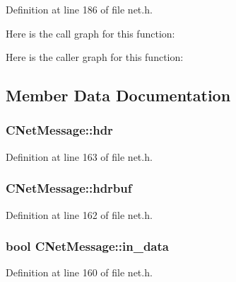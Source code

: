 Definition at line 186 of file net.\+h.



Here is the call graph for this function\+:




Here is the caller graph for this function\+:




\subsection{Member Data Documentation}
\hypertarget{class_c_net_message_ae7215dca62862a3688f7eeb94646c377}{}
\subsubsection[{hdr}]{ C\+Net\+Message\+::hdr}\label{class_c_net_message_ae7215dca62862a3688f7eeb94646c377}


Definition at line 163 of file net.\+h.

\hypertarget{class_c_net_message_a80a6f95f0c187aa97788118248cbf452}{}
\subsubsection[{hdrbuf}]{ C\+Net\+Message\+::hdrbuf}\label{class_c_net_message_a80a6f95f0c187aa97788118248cbf452}


Definition at line 162 of file net.\+h.

\hypertarget{class_c_net_message_a8f399ad7225f980bdab3ede17b1b23af}{}
\subsubsection[{in\+\_\+data}]{\setlength{\rightskip}{0pt plus 5cm}bool C\+Net\+Message\+::in\+\_\+data}\label{class_c_net_message_a8f399ad7225f980bdab3ede17b1b23af}


Definition at line 160 of file net.\+h.

\hypertarget{class_c_net_message_a418f59287d1805dda6959f27a170c855}{}
